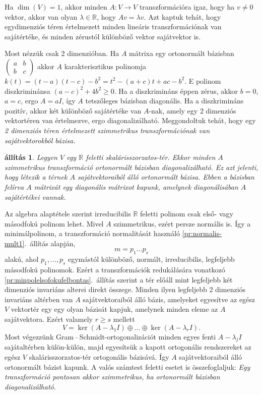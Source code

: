 \documentclass[a4paper, showtrims]{memoir}
\makeatletter
\renewenvironment{proof}[1][\proofname]
    {\par\pushQED{\qed}%
    \normalfont \topsep6\p@\@plus6\p@\relax
    \trivlist
    \item[\hskip\labelsep
        \itshape
    #1\@addpunct{:}]\ignorespaces}
    {\popQED\endtrivlist\@endpefalse}
\theoremstyle{plain}
\newtheorem{proposition}{állítás}[chapter]
\theoremstyle{remark}
\theoremstyle{definition}
\makeatother
\begin{document}
Ha $\dim(V)=1$, akkor minden $A:V\to V$ transzformációra igaz, hogy ha $v\neq 0$ vektor, 
akkor van olyan $\lambda\in\mathbb{R}$,
hogy $Av=\lambda v$. 
Azt kaptuk tehát, hogy egydimenziós téren értelmezett minden lineáris transzformációnak
van sajátértéke, és minden zérustól különböző vektor sajátvektor is.

Most nézzük csak 2 dimenzióban.
Ha $A$ mátrixa egy ortonormált bázisban
\begin{math}
	\begin{pmatrix}
		a & b \\b&c
	\end{pmatrix}
\end{math}
akkor $A$ karakterisztikus polinomja 
$   k\left( t \right)
    =
    \left( t-a \right)\left( t-c \right)-b^2
    =
    t^2-\left( a+c \right)t+ac-b^2.$
E polinom diszkriminánsa 
\(
    \left( a-c \right)^2+4b^2\geq 0.
\)
Ha a diszkrimináns éppen zérus, akkor $b=0$, $a=c$, ergo $A=aI$, így $A$ tetszőleges bázisban diagonális.
Ha a diszkrimináns pozitív, akkor két különböző sajátértéke van $A$-nak, amely egy 2 dimenziós 
vektortéren van értelmezve, ergo diagonalizálható.
Meggondoltuk tehát, hogy egy
\emph{
	2 dimenziós téren értelmezett szimmetrikus transzformációnak van sajátvektorokból bázisa.
}
\begin{proposition}
	Legyen $V$ egy $\mathbb{R}$ feletti skalárisszorzatos-tér.
	Ekkor minden $A$ szimmetrikus transzformáció ortonormált bázisban diagonalizálható.
	Ez azt jelenti, hogy létezik a térnek $A$ sajátvektoraiból álló ortonormált bázisa.
	Ebben a bázisban felírva $A$ mátrixát egy diagonális mátrixot kapunk,
	amelynek diagonálisában $A$ sajátértékei vannak.
\end{proposition}
\begin{proof}
	Az algebra alaptétele szerint irreducibilis $\mathbb{R}$ feletti polinom
	csak első- vagy másodfokú polinom lehet.
	Mivel $A$ szimmetrikus, ezért persze normális is.
	Így a minimálpolinom, a transzformáció normalitását használó \ref{pr:normalis-mult1}.~állítás alapján,
	\[
		m=p_1\dots p_s
	\]
	alakú, ahol $p_1,\ldots,p_s$ egymástól különböző, normált, irreducibilis, legfeljebb másodfokú polinomok.
	Ezért a transzformációk redukálására vonatkozó \ref{pr:minpolelsofokufelbontas}.~állítás szerint
	a tér előáll mint legfeljebb két dimenziós invariáns alterei direkt összege.
	Minden ilyen legfeljebb 2 dimenziós invariáns altérben van $A$ sajátvektoraiból álló bázis,
	amelyeket egyesítve az egész $V$ vektortér egy egy olyan bázisát kapjuk,
	amelynek minden eleme az $A$ sajátvektora.
	Ezért valamely $r\geq s$ mellett
	\[
		V=\ker\left( A-\lambda_1I \right)\oplus\dots\oplus\ker\left( A-\lambda_rI \right).
	\]
	Most végezzünk Gram\,--\,Schmidt-ortogonalizációt
	minden egyes fenti $A-\lambda_jI$ sajátaltérben külön-külön,
	majd egyesítsük a kapott ortogonális rendszereket az egész $V$ skalárisszorzatos-tér ortogonális bázisává.
	Így $A$ sajátvektoraiból álló ortonormált bázist kapunk.
\end{proof}
A valós számtest feletti esetet is összefoglaljuk:
\emph{
    Egy transzformáció pontosan akkor szimmetrikus, ha ortonormált bázisban diagonalizálható.
}
\end{document}
